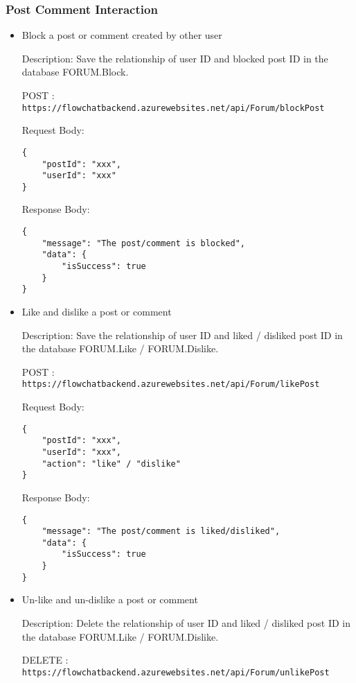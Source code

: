 \documentclass[11pt, a4paper]{article}
\begin{document}
\subsubsection{Post Comment Interaction}
\begin{itemize}
\item Block a post or comment created by other user

Description: Save the relationship of user ID and blocked post ID in the database FORUM.Block.

POST :  \texttt{https://flowchatbackend.azurewebsites.net/api/Forum/blockPost}
    
Request Body:
    \begin{lstlisting}[breaklines=true, frame=single]
{
    "postId": "xxx",
    "userId": "xxx"
}
    \end{lstlisting}

    Response Body:
    \begin{lstlisting}[breaklines=true, frame=single]
{
    "message": "The post/comment is blocked",
    "data": {
        "isSuccess": true
    }
}
    \end{lstlisting}

\item Like and dislike a post or comment

Description: Save the relationship of user ID and liked / disliked post ID in the database FORUM.Like / FORUM.Dislike.

POST :  \texttt{https://flowchatbackend.azurewebsites.net/api/Forum/likePost}
    
Request Body:
    \begin{lstlisting}[breaklines=true, frame=single]
{
    "postId": "xxx",
    "userId": "xxx",
    "action": "like" / "dislike"
}
    \end{lstlisting}

    Response Body:
    \begin{lstlisting}[breaklines=true, frame=single]
{
    "message": "The post/comment is liked/disliked",
    "data": {
        "isSuccess": true
    }
}
    \end{lstlisting}

\item Un-like and un-dislike a post or comment

Description: Delete the relationship of user ID and liked / disliked post ID in the database FORUM.Like / FORUM.Dislike.

DELETE :  \texttt{https://flowchatbackend.azurewebsites.net/api/Forum/unlikePost}
    

\end{itemize}
\end{document}
